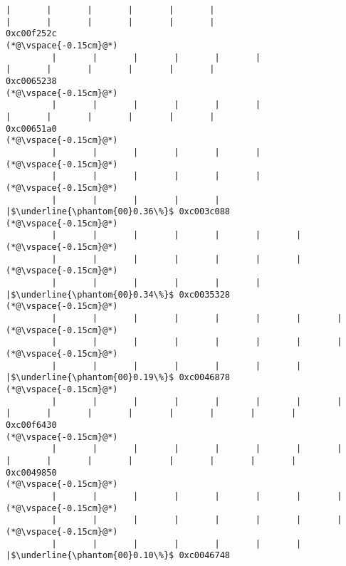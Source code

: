\begin{lstlisting}[caption=NewDirectByteBuffer, label=profile:C2JNewDirectBuffer-512, numberbychapter=true, frame=lines, float, floatplacement=t]
         |       |       |       |       |       |                                |       |       |       |       |       |                               0xc00f252c
(*@\vspace{-0.15cm}@*)
         |       |       |       |       |       |                                |       |       |       |       |       |                               0xc0065238
(*@\vspace{-0.15cm}@*)
         |       |       |       |       |       |                                |       |       |       |       |       |                               0xc00651a0
(*@\vspace{-0.15cm}@*)
         |       |       |       |       |       |
(*@\vspace{-0.15cm}@*)
         |       |       |       |       |       |
(*@\vspace{-0.15cm}@*)
         |       |       |       |       |       |$\underline{\phantom{00}0.36\%}$ 0xc003c088
(*@\vspace{-0.15cm}@*)
         |       |       |       |       |       |       |
(*@\vspace{-0.15cm}@*)
         |       |       |       |       |       |       |
(*@\vspace{-0.15cm}@*)
         |       |       |       |       |       |       |$\underline{\phantom{00}0.34\%}$ 0xc0035328
(*@\vspace{-0.15cm}@*)
         |       |       |       |       |       |       |       |
(*@\vspace{-0.15cm}@*)
         |       |       |       |       |       |       |       |
(*@\vspace{-0.15cm}@*)
         |       |       |       |       |       |       |       |$\underline{\phantom{00}0.19\%}$ 0xc0046878
(*@\vspace{-0.15cm}@*)
         |       |       |       |       |       |       |       |        |       |       |       |       |       |       |       |       0xc00f6430
(*@\vspace{-0.15cm}@*)
         |       |       |       |       |       |       |       |        |       |       |       |       |       |       |       |       0xc0049850
(*@\vspace{-0.15cm}@*)
         |       |       |       |       |       |       |       |
(*@\vspace{-0.15cm}@*)
         |       |       |       |       |       |       |       |
(*@\vspace{-0.15cm}@*)
         |       |       |       |       |       |       |       |$\underline{\phantom{00}0.10\%}$ 0xc0046748

\end{lstlisting}
